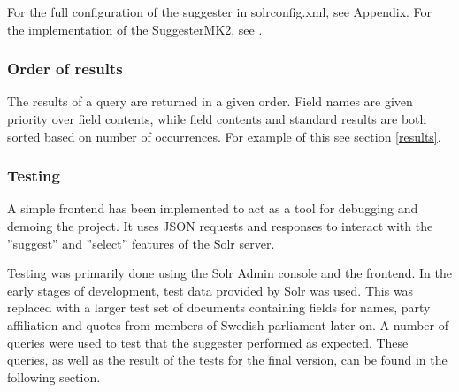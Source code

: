 For the full configuration of the suggester in solrconfig.xml, see Appendix.
For the implementation of the SuggesterMK2, see \cite{GITHUBPROJ}.

\subsubsection{Order of results}

The results of a query are returned in a given order. Field names are given priority over field contents, while field contents and standard results are both sorted based on number of occurrences. For example of this see section \ref{results}.

\subsubsection{Testing}

A simple frontend has been implemented to act as a tool for debugging and demoing the project. It uses JSON requests and responses to interact with the ''suggest'' and ''select'' features of the Solr server.

Testing was primarily done using the Solr Admin console and the frontend.
In the early stages of development, test data provided by Solr was used. This was replaced with a larger test set of documents containing fields for names, party affiliation and quotes from members of Swedish parliament later on. A number of queries were used to test that the suggester performed as expected. These queries, as well as the result of the tests for the final version, can be found in the following section. 
